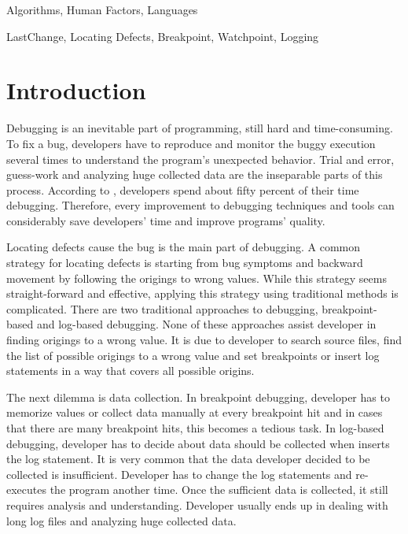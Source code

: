 \documentclass[preprint]{sigplanconf}
\begin{document}

\terms
Algorithms, Human Factors, Languages

\keywords
LastChange, Locating Defects, Breakpoint, Watchpoint, Logging

\section{Introduction}
Debugging is an inevitable part of programming, still hard and time-consuming. To fix a bug, developers have to reproduce and monitor the buggy execution several times to understand the program's unexpected behavior. Trial and error, guess-work and analyzing huge collected data are the inseparable parts of this process. According to \cite{LaToza}, developers spend about fifty percent of their time debugging. Therefore, every improvement to debugging techniques and tools can considerably save developers' time and improve programs' quality.

Locating defects cause the bug is the main part of debugging. A common strategy for locating defects is starting from bug symptoms and backward movement by following the origings to wrong values. While this strategy seems straight-forward and effective, applying this strategy using traditional methods is complicated. There are two traditional approaches to debugging, breakpoint-based and log-based debugging. None of these approaches assist developer in finding origings to a wrong value. It is due to developer to search source files, find the list of possible origings to a wrong value and set breakpoints or insert log statements in a way that covers all possible origins.

The next dilemma is data collection. In breakpoint debugging, developer has to memorize values or collect data manually at every breakpoint hit and in cases that there are many breakpoint hits, this becomes a tedious task. In log-based debugging, developer has to decide about data should be collected when inserts the log statement. It is very common that the data developer decided to be collected is insufficient. Developer has to change the log statements and re-executes the program another time. Once the sufficient data is collected, it still requires analysis and understanding. Developer usually ends up in dealing with long log files and analyzing huge collected data.
\end{document}
